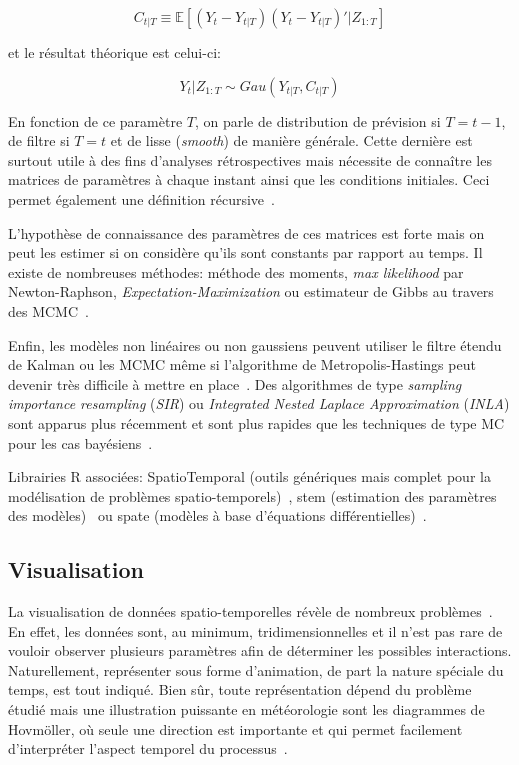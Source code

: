 \begin{equation}
    C_{t|T} \equiv \mathbb{E}[(Y_{t} - Y_{t|T})(Y_{t} - Y_{t|T})'|Z_{1:T}]
\end{equation}

et le résultat théorique est celui-ci:

\begin{equation}
    Y_{t}|Z_{1:T} \sim Gau(Y_{t|T}, C_{t|T})
\end{equation}

En fonction de ce paramètre $T$, on parle de distribution de prévision si $T = t-1$, de filtre si $T = t$ et de lisse (\textit{smooth}) de manière générale. Cette dernière est surtout utile à des fins d'analyses rétrospectives mais nécessite de connaître les matrices de paramètres à chaque instant ainsi que les conditions initiales. Ceci permet également une définition récursive~\cite{grewal2011kalman}.

L'hypothèse de connaissance des paramètres de ces matrices est forte mais on peut les estimer si on considère qu'ils sont constants par rapport au temps. Il existe de nombreuses méthodes: méthode des moments, \textit{max likelihood} par Newton-Raphson, \textit{Expectation-Maximization} ou estimateur de Gibbs au travers des MCMC~\cite{shumway2010time, cressie2015statistics}.

Enfin, les modèles non linéaires ou non gaussiens peuvent utiliser le filtre étendu de Kalman ou les MCMC même si l'algorithme de Metropolis-Hastings peut devenir très difficile à mettre en place~\cite{van2000unscented}. Des algorithmes de type \textit{sampling importance resampling} (\textit{SIR}) ou \textit{Integrated Nested Laplace Approximation} (\textit{INLA}) sont apparus plus récemment et sont plus rapides que les techniques de type MC pour les cas bayésiens~\cite{rue2009approximate}.

Librairies R associées: SpatioTemporal (outils génériques mais complet pour la modélisation de problèmes spatio-temporels)~\cite{keller2015unified}, stem (estimation des paramètres des modèles)~\cite{cameletti_stem} ou spate (modèles à base d'équations différentielles)~\cite{sigrist2015spate}.

\subsection{Visualisation}

La visualisation de données spatio-temporelles révèle de nombreux problèmes~\cite{chen2007handbook}. En effet, les données sont, au minimum, tridimensionnelles et il n'est pas rare de vouloir observer plusieurs paramètres afin de déterminer les possibles interactions. Naturellement, représenter sous forme d'animation, de part la nature spéciale du temps, est tout indiqué. Bien sûr, toute représentation dépend du problème étudié mais une illustration puissante en météorologie sont les diagrammes de Hovmöller, où seule une direction est importante et qui permet facilement d'interpréter l'aspect temporel du processus~\cite{hovmoller1949trough}.

